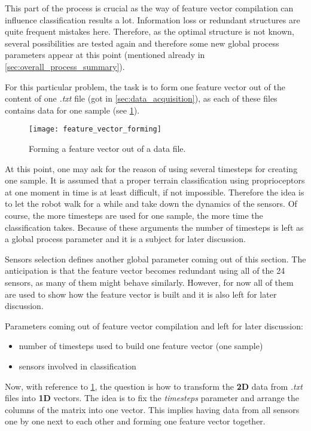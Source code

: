This part of the process is crucial as the way of feature vector compilation can influence classification results a lot. Information loss or redundant structures are quite frequent mistakes here. Therefore, as the optimal structure is not known, several possibilities are tested again and therefore some new global process parameters appear at this point (mentioned already in \cref{sec:overall_process_summary}).

For this particular problem, the task is to form one feature vector out of the content of one \textit{.txt} file (got in \cref{sec:data_acquisition}), as each of these files contains data for one sample (see \cref{img:feature_vector_forming}).

\begin{figure}[H]
  \centering
  \texttt{[image: feature\_vector\_forming]}
  \caption{Forming a feature vector out of a data file.}
  \label{img:feature_vector_forming}
\end{figure}

At this point, one may ask for the reason of using several timesteps for creating one sample. It is assumed that a proper terrain classification using proprioceptors at one moment in time is at least difficult, if not impossible. Therefore the idea is to let the robot walk for a while and take down the dynamics of the sensors. Of course, the more timesteps are used for one sample, the more time the classification takes. Because of these arguments the number of timesteps is left as a global process parameter and it is a subject for later discussion.

Sensors selection defines another global parameter coming out of this section. The anticipation is that the feature vector becomes redundant using all of the 24 sensors, as many of them might behave similarly. However, for now all of them are used to show how the feature vector is built and it is also left for later discussion.

Parameters coming out of feature vector compilation and left for later discussion:
\begin{itemize}
\item number of timesteps used to build one feature vector (one sample)
\item sensors involved in classification
\end{itemize}

Now, with reference to \cref{img:feature_vector_forming}, the question is how to transform the \textbf{2D} data from \textit{.txt} files into \textbf{1D} vectors. The idea is to fix the \textit{timesteps} parameter and arrange the columns of the matrix into one vector. This implies having data from all sensors one by one next to each other and forming one feature vector together. 

